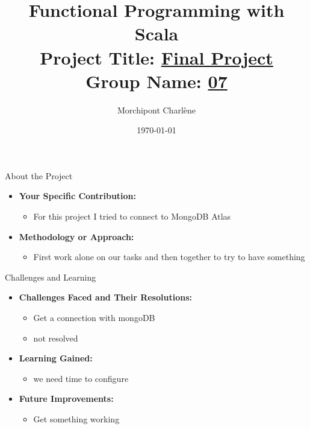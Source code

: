 \documentclass[serif, aspectratio=169]{beamer}
\title[Project Presentation]{Functional Programming with Scala \\ { \large Project Title: \underline{ Final Project \hspace{2cm}}}\\ {\small Group Name: \underline{ 07 \hspace{2cm} }}}
\author{Morchipont Charlène}
\institute{ IG5\_Polytech}
\date{\small \today}
\begin{document}
\begin{frame}
    \titlepage
\end{frame}

\begin{frame}{About the Project}
    \begin{itemize}
        \item \textbf{Your Specific Contribution:}
        \begin{itemize}
            \item For this project I tried  to connect to MongoDB Atlas
        \end{itemize}
        \medskip
        \item \textbf{Methodology or Approach:}
        \begin{itemize}
            \item First work alone on our tasks and then together to try to have something
        \end{itemize}

    \end{itemize}
\end{frame}

\begin{frame}{Challenges and Learning}
    \begin{itemize}
        \item \textbf{Challenges Faced and Their Resolutions:}
        \begin{itemize}
            \item Get a connection with mongoDB
            \item not resolved
        \end{itemize}
        \medskip
        \item \textbf{Learning Gained:}
        \begin{itemize}
            \item we need time to configure 
        \end{itemize}
        \medskip
        \item \textbf{Future Improvements:}
        \begin{itemize}
            \item Get something working
        \end{itemize}
    \end{itemize}
\end{frame}
\end{document}
